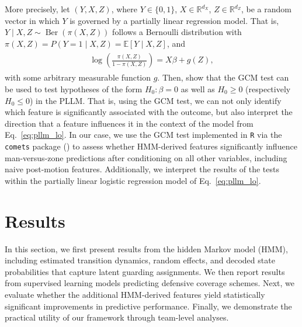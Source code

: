 \documentclass[namedate,webpdf,modern,medium]{oup-authoring-template}
\newcommand{\given}{\mid}
\begin{document}
More precisely, let $(Y, X, Z)$, where $Y \in \{0, 1\}$, $X \in \mathbb{R}^{d_X}$, $Z \in \mathbb{R}^{d_Z}$, be a random vector in which $Y$ is governed by a partially linear regression model. That is, $Y \given X, Z \sim \operatorname{Ber}(\pi(X,Z))$
follows a Bernoulli distribution with $\pi(X,Z) = P(Y=1 \mid X,Z) = \mathbb{E}[Y \given
X,Z]$, and 
\begin{align}
\label{eq:pllm_lo}
\begin{aligned}
\log\left(\frac{\pi(X,Z)}{1-\pi(X,Z)}\right) =
X\beta + g(Z),
\end{aligned}
\end{align}
with some arbitrary measurable function $g$. Then, \citet{bajons2025rGAX} show that the GCM test can be used to test hypotheses of the form $H_0: \beta = 0$ as well as $H_0 \ge 0$ (respectively $H_0 \le 0$) in the PLLM.  
That is, using the GCM test, we can not only identify which feature is significantly associated with the outcome, but also interpret the direction that a feature influences it in the context of the model from Eq.~\ref{eq:pllm_lo}. In our case, we use the GCM test implemented in \texttt{R} via the \texttt{comets} package (\citealp{kook24comets}) to assess whether HMM-derived features significantly influence man-versus-zone predictions after conditioning on all other variables, including naive post-motion features. Additionally, we interpret the results of the tests within the partially linear logistic regression model of Eq.~\ref{eq:pllm_lo}.

\section{Results}\label{sec:results}
In this section, we first present results from the hidden Markov model (HMM), including estimated transition dynamics, random effects, and decoded state probabilities that capture latent guarding assignments. We then report results from supervised learning models predicting defensive coverage schemes. Next, we evaluate whether the additional HMM-derived features yield statistically significant improvements in predictive performance. Finally, we demonstrate the practical utility of our framework through team-level analyses.
\end{document}
